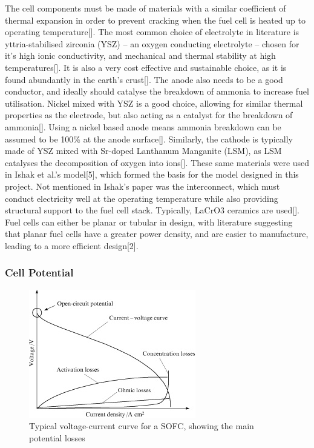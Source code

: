     The cell components must be made of materials with a similar coefficient of thermal expansion in order to prevent cracking when the fuel cell is heated up to operating temperature[]. The most common choice of electrolyte in literature is yttria-stabilised zirconia (YSZ) – an oxygen conducting electrolyte – chosen for it’s high ionic conductivity, and mechanical and thermal stability at high temperatures[]. It is also a very cost effective and sustainable choice, as it is found abundantly in the earth’s crust[]. The anode also needs to be a good conductor, and ideally should catalyse the breakdown of ammonia to increase fuel utilisation. Nickel mixed with YSZ is a good choice, allowing for similar thermal properties as the electrode, but also acting as a catalyst for the breakdown of ammonia[]. Using a nickel based anode means ammonia breakdown can be assumed to be 100\% at the anode surface[]. Similarly, the cathode is typically made of YSZ mixed with Sr-doped Lanthanum Manganite (LSM), as LSM catalyses the decomposition of oxygen into ions[]. These same materials were used in Ishak et al.’s model[5], which formed the basis for the model designed in this project. Not mentioned in Ishak’s paper was the interconnect, which must conduct electricity well at the operating temperature while also providing structural support to the fuel cell stack.  Typically, LaCrO3 ceramics are used[]. Fuel cells can either be planar or tubular in design, with literature suggesting that planar fuel cells have a greater power density, and are easier to manufacture, leading to a more efficient design[2].
    \subsubsection{Cell Potential}
    
\begin{figure}[htb]
    \centering
    \includegraphics{voltagecurve.jpg}
    \caption{Typical voltage-current curve for a SOFC, showing the main potential losses \cite{lewisref9}}
    \label{fig:SOFCvoltagecurve}
\end{figure}
    
